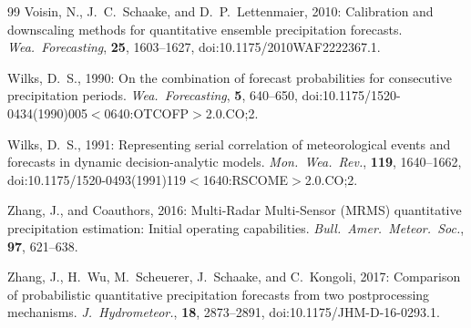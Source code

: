 \documentclass[11pt]{article}
\begin{document}
\begin{thebibliography}{99}
Voisin, N., J.~C.\ Schaake, and D.~P.\ Lettenmaier, 2010:
Calibration and downscaling methods for quantitative ensemble precipitation
forecasts.
\textit{Wea.\ Forecasting}, \textbf{25}, 1603--1627,
doi:10.1175/2010WAF2222367.1.

Wilks, D.~S., 1990:
On the combination of forecast probabilities for consecutive precipitation
periods.
\textit{Wea.\ Forecasting}, \textbf{5}, 640--650,
doi:10.1175/1520-0434(1990)005$<$0640:OTCOFP$>$2.0.CO;2.

Wilks, D.~S., 1991:
Representing serial correlation of meteorological events and forecasts in
dynamic decision-analytic models.
\textit{Mon.\ Wea.\ Rev.}, \textbf{119}, 1640--1662,
doi:10.1175/1520-0493(1991)119$<$1640:RSCOME$>$2.0.CO;2.

Zhang, J., and Coauthors, 2016:
Multi-Radar Multi-Sensor (MRMS) quantitative precipitation
estimation: Initial operating capabilities.
\textit{Bull.\ Amer.\ Meteor.\ Soc.}, \textbf{97}, 621--638.

Zhang, J., H.\ Wu, M.\ Scheuerer, J.\ Schaake, and C.\ Kongoli, 2017:
Comparison of probabilistic quantitative precipitation forecasts from two
postprocessing mechanisms.
\textit{J.\ Hydrometeor.}, \textbf{18}, 2873--2891,
doi:10.1175/JHM-D-16-0293.1.

\end{thebibliography}
\end{document}
